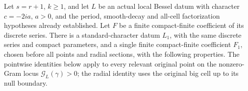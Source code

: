 \begin{proposition}
\label{prop:archimedean-character-transport}
Let \(s=r+1\), \(k\ge1\), and let \(L\) be an actual local
Bessel datum with character \(c=-2ia\), \(a>0\), and the
period, smooth-decay and all-cell factorization hypotheses
already established. Let \(F\) be a finite compact-finite
coefficient of its discrete series. There is a standard-character
datum \(L_1\), with the same discrete series and compact
parameters, and a single finite compact-finite coefficient
\(F_1\), chosen before all points and radial sections, with
the following properties. The pointwise identities below apply
to every relevant original point on the nonzero-Gram locus
\(\mathcal G_L(\gamma)>0\); the radial identity uses the
original big cell up to its null boundary.


\end{proposition}
